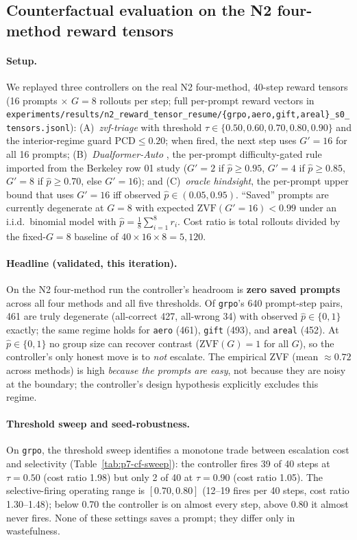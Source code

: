 \subsection{Counterfactual evaluation on the N2 four-method reward tensors}
\label{sec:p7-controller-cf}
\paragraph{Setup.}
We replayed three controllers on the real N2 four-method, 40-step reward
tensors (16 prompts $\times$ $G{=}8$ rollouts per step; full per-prompt
reward vectors in
\texttt{experiments/results/n2\_reward\_tensor\_resume/\{grpo,aero,gift,areal\}\_s0\_tensors.jsonl}):
(A)~\emph{zvf-triage} with threshold $\tau \in \{0.50, 0.60, 0.70, 0.80, 0.90\}$
and the interior-regime guard $\mathrm{PCD} \le 0.20$; when fired, the next
step uses $G'{=}16$ for all 16 prompts;
(B)~\emph{Dualformer-Auto} \citep{su2024dualformer}, the per-prompt
difficulty-gated rule imported from the Berkeley row 01 study ($G'{=}2$ if
$\hat p \ge 0.95$, $G'{=}4$ if $\hat p \ge 0.85$, $G'{=}8$ if $\hat p \ge
0.70$, else $G'{=}16$); and (C)~\emph{oracle hindsight}, the per-prompt
upper bound that uses $G'{=}16$ iff observed $\hat p \in (0.05, 0.95)$.
``Saved'' prompts are currently degenerate at $G{=}8$ with expected
$\mathrm{ZVF}(G'{=}16) < 0.99$ under an i.i.d.\ binomial model with
$\hat p = \frac{1}{8}\sum_{i=1}^{8} r_i$. Cost ratio is total rollouts
divided by the fixed-$G{=}8$ baseline of $40 \times 16 \times 8 = 5{,}120$.

\paragraph{Headline (validated, this iteration).}
On the N2 four-method run the controller's headroom is
\textbf{zero saved prompts} across all four methods and all five
thresholds. Of \texttt{grpo}'s 640 prompt-step pairs, 461 are truly
degenerate (all-correct 427, all-wrong 34) with observed
$\hat p \in \{0,1\}$ exactly; the same regime holds for
\texttt{aero} (461), \texttt{gift} (493), and \texttt{areal} (452).
At $\hat p \in \{0,1\}$ no group size can recover contrast
($\mathrm{ZVF}(G) = 1$ for all $G$), so the controller's only honest
move is to \emph{not} escalate. The empirical ZVF (mean $\approx 0.72$
across methods) is high \emph{because the prompts are easy}, not because
they are noisy at the boundary; the controller's design hypothesis
explicitly excludes this regime.

\paragraph{Threshold sweep and seed-robustness.}
On \texttt{grpo}, the threshold sweep identifies a monotone trade
between escalation cost and selectivity (Table~\ref{tab:p7-cf-sweep}):
the controller fires 39 of 40 steps at $\tau{=}0.50$ (cost ratio 1.98)
but only 2 of 40 at $\tau{=}0.90$ (cost ratio 1.05). The selective-firing
operating range is $[0.70, 0.80]$ (12--19 fires per 40 steps,
cost ratio 1.30--1.48); below 0.70 the controller is on almost every
step, above 0.80 it almost never fires. None of these settings saves a
prompt; they differ only in wastefulness.

